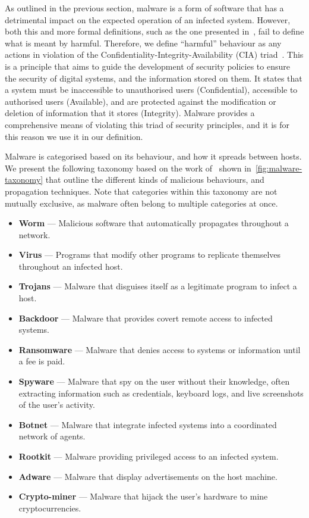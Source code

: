 \documentclass[main.tex]{subfiles}
\begin{document}
\noindent
As outlined in the previous section, malware is a form of software that has a detrimental impact on the expected operation of an infected system. However, both this and more formal definitions, such as the one presented in~\citep{kramerGeneralDefinitionMalware2010a}, fail to define what is meant by harmful. Therefore, we define ``harmful'' behaviour as any actions in violation of the Confidentiality-Integrity-Availability (CIA) triad~\citep{cochranCIATriadSafeguarding2024}. This is a principle that aims to guide the development of security policies to ensure the security of digital systems, and the information stored on them. It states that a system must be inaccessible to unauthorised users (Confidential), accessible to authorised users (Available), and are protected against the modification or deletion of information that it stores (Integrity). Malware provides a comprehensive means of violating this triad of security principles, and it is for this reason we use it in our definition.

Malware is categorised based on its behaviour, and how it spreads between hosts. We present the following taxonomy based on the work of~\citep{manirihoSystematicLiteratureReview2024} shown in~\cref{fig:malware-taxonomy} that outline the different kinds of malicious behaviours, and propagation techniques. Note that categories within this taxonomy are not mutually exclusive, as malware often belong to multiple categories at once. 

\begin{itemize}
    \item \textbf{Worm} --- Malicious software that automatically propagates throughout a network. 
    \item \textbf{Virus} --- Programs that modify other programs to replicate themselves throughout an infected host. 
    \item \textbf{Trojans} --- Malware that disguises itself as a legitimate program to infect a host.
    \item \textbf{Backdoor} --- Malware that provides covert remote access to infected systems. 
    \item \textbf{Ransomware} --- Malware that denies access to systems or information until a fee is paid.
    \item \textbf{Spyware} --- Malware that spy on the user without their knowledge, often extracting information such as credentials, keyboard logs, and live screenshots of the user's activity. 
    \item \textbf{Botnet} --- Malware that integrate infected systems into a coordinated network of agents. 
    \item \textbf{Rootkit} --- Malware providing privileged access to an infected system.
    \item \textbf{Adware} --- Malware that display advertisements on the host machine.
    \item \textbf{Crypto-miner} --- Malware that hijack the user's hardware to mine cryptocurrencies.
\end{itemize}
\end{document}
